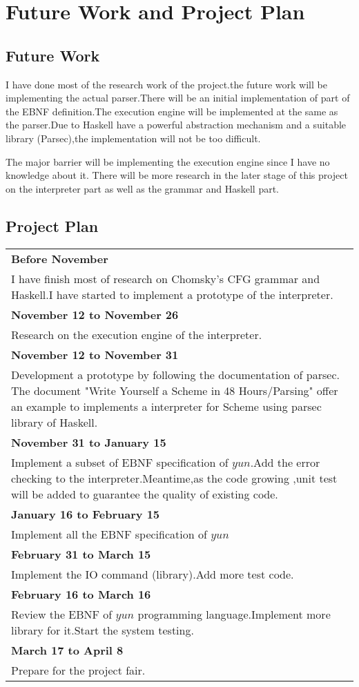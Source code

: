 \chapter{Future Work and Project Plan}
\section{Future Work}
I have done most of the research work of the project.the future work will be implementing the actual parser.There will be an initial implementation of part of the EBNF definition.The execution engine will be implemented at the same as the parser.Due to Haskell have a powerful abstraction mechanism and a suitable library (Parsec),the implementation will not be too difficult.

The major barrier will be implementing the execution engine since I have no knowledge about it.
There will be more research in the later stage of this project on the interpreter part as well as the grammar and Haskell part.

\section{Project Plan}
\begin{tabular}{|p{}|}

\hline \textbf{Before November} \\
I have finish most of research on Chomsky's 
CFG grammar and Haskell.I have started to implement a prototype of the interpreter.\\

\hline \textbf{November 12 to November 26}\\
Research on the execution engine of the interpreter.\\
\hline \textbf{November 12 to November 31} \\
Development a prototype by following the documentation of parsec. The document  "Write Yourself a Scheme in 48 Hours/Parsing" offer an example to implements a interpreter for Scheme using parsec library of Haskell.\\
\hline
\textbf{November 31 to January 15} \\
Implement a subset of EBNF specification of $yun$.Add the error checking to the interpreter.Meantime,as the code growing ,unit test will be added to guarantee the quality of existing code.
\\
\hline  \textbf{January 16 to February 15}\\
Implement all the EBNF specification of $yun$\\
\hline   \textbf{February 31 to March 15}\\
Implement the IO command (library).Add more test code.\\
\hline \textbf{February 16 to March 16}\\
Review the EBNF of $yun$ programming language.Implement more library for it.Start the system testing.
\\ 
\hline \textbf{March 17 to April 8}\\
Prepare for the project fair.\\
\hline
\end{tabular} 




